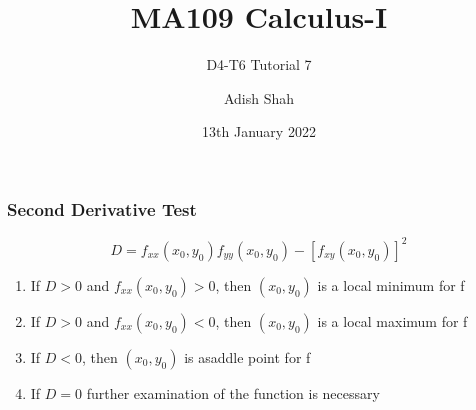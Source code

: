 \documentclass[handout]{beamer}
\title[MA109 Calculus-I] %
{MA109 Calculus-I}
\subtitle{D4-T6 Tutorial 7}
\author[Adish Shah] %
{Adish Shah}
\date[13th January 2022] %
{13th January 2022}
\begin{document}
\frame{\titlepage}

\begin{frame}
	\frametitle{Second Derivative Test}
	\begin{theorem}
		
	\[D = f_{xx}(x_{0},y_{0})f_{yy}(x_{0},y_{0}) - [f_{xy}(x_{0},y_{0})]^{2} \]
	\begin{enumerate}
		\item If $D > 0$ and $f_{xx}(x_{0},y_{0}) > 0$, then $(x_{0},y_{0})$ is a local minimum for f
		\item  If $D > 0$ and $f_{xx}(x_{0},y_{0}) < 0$, then $(x_{0},y_{0})$ is a local maximum for f
		\item If $D < 0$, then $(x_{0},y_{0})$ is asaddle point for f
		\item If $D = 0$ further examination of the function is necessary
	\end{enumerate}
	\end{theorem}

\end{frame}

\end{document}
